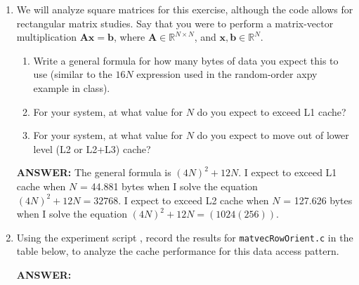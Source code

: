 \documentclass[letter]{article}
\renewcommand{\vec}[1]{\ensuremath{\boldsymbol{#1}}} %
\newcommand{\mypath}[1]{\texttt{\path{#1}}}
\begin{document}
\begin{enumerate}
        \item We will analyze square matrices for this exercise, although the code allows for rectangular matrix studies. Say that you were to perform a matrix-vector multiplication $\vec{A}\vec{x} = \vec{b}$, where $\vec{A} \in \mathbb{R}^{N\times N}$, and $\vec{x}, \vec{b} \in \mathbb{R}^N$. 
            \begin{enumerate}
                \item Write a general formula for how many bytes of data you expect this to use (similar to the $16N$ expression used in the random-order axpy example in class).
                \item For your system, at what value for $N$ do you expect to exceed L1 cache? 
                \item For your system, at what value for $N$ do you expect to move out of lower level (L2 or L2+L3) cache? 
            \end{enumerate}
        
        \textbf{ANSWER:} The general formula is $(4N)^2 + 12N$. \newline
        I expect to exceed L1 cache when $N$ = 44.881 bytes when I solve the equation $(4N)^2 + 12N = 32768$. \newline
        I expect to exceed L2 cache when $N$ = 127.626 bytes when I solve the equation $(4N)^2 + 12N = (1024(256))$. \newline
        

        
        \item Using the experiment script \mypath{cache_row_orient.sh}, record the results for \texttt{matvecRowOrient.c} in the table below, to analyze the cache performance for this data access pattern. 
        
        \textbf{ANSWER:} %


\end{enumerate}
\end{document}
